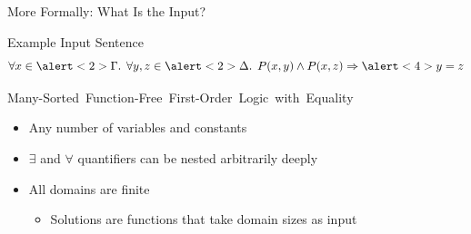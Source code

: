 \documentclass{beamer}
\begin{document}
\begin{frame}{More Formally: What Is the Input?}
  \begin{exampleblock}{Example Input Sentence}
    \[
      \forall x \in \alert<2>{\Gamma}\text{.
      }\forall y, z \in \alert<2>{\Delta}\text{.
      }P(x, y) \land P(x, z) \Rightarrow \alert<4>{y=z}
    \]
  \end{exampleblock}
  \begin{block}{\mbox{\alert<2>{Many-Sorted} \alert<3>{Function-Free}
        First-Order Logic with \alert<4>{Equality}}}
  \begin{itemize}
    \item<5-> Any number of variables and constants
    \item<6-> \alert{$\exists$} and \alert{$\forall$} quantifiers can be nested
          arbitrarily deeply
    \item<6-> All domains are finite
          \begin{itemize}
            \item Solutions are functions that take domain sizes as input
          \end{itemize}
  \end{itemize}
  \end{block}
\end{frame}
\end{document}
